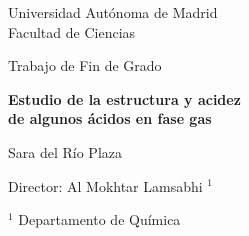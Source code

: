 \begin{titlepage}
        \begin{center}
            \vspace*{5mm}
            \large \textsf{ Universidad Autónoma de Madrid\\
            Facultad de Ciencias}
            \vspace*{3.5cm}
        
            Trabajo de Fin de Grado 
        
            \vspace{3cm}
        
            \Large\textbf{Estudio de la estructura y acidez \\de algunos ácidos en fase gas} %
        
            \vspace{2cm}
        
            \large Sara del Río Plaza %
        
            \vfill
        
            \normalsize Director: Al Mokhtar Lamsabhi $^{1}$ \\%
            
        
            \vspace{1cm}
        
            $^{1}$ Departamento de Química\\ %
     
        
        \end{center}
    \end{titlepage}